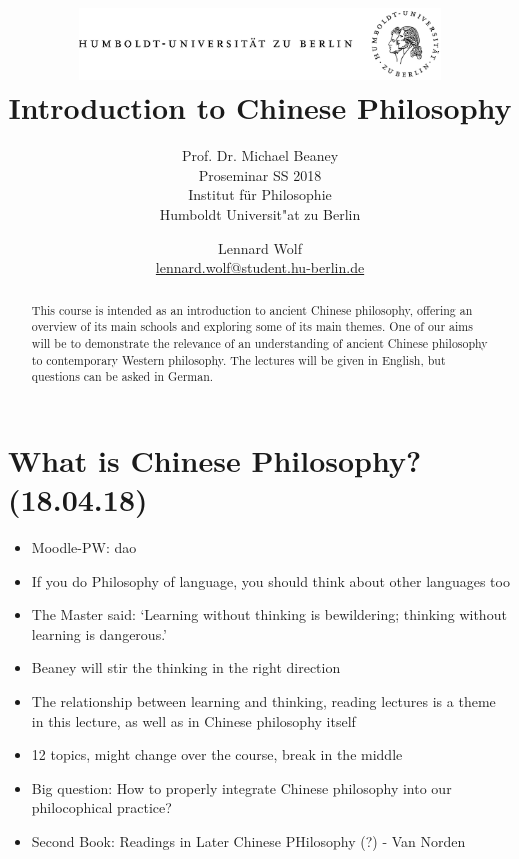 \documentclass[emulatestandardclasses]{scrartcl}
\date{\vspace{-3ex}}
\begin{document}
\title{
	\includegraphics*[bb=0 0 720 200, width=0.72\textwidth]{ErstesSem/images/hu_logo.png}\\
	\vspace{25pt}
	Introduction to Chinese Philosophy}
\subtitle{\vspace{10pt}
			Prof. Dr. Michael Beaney\\
			Proseminar SS 2018\\
          Institut für Philosophie\\ 
          Humboldt Universit"at zu Berlin}
\author{Lennard Wolf\\
        \small{\href{mailto:lennard.wolf@student.hu-berlin.de}{lennard.wolf@student.hu-berlin.de}}}
\maketitle
\begin{abstract}

This course is intended as an introduction to ancient Chinese philosophy, offering an overview of its main schools and exploring some of its main themes. One of our aims will be to demonstrate the relevance of an understanding of ancient Chinese philosophy to contemporary Western philosophy. The lectures will be given in English, but questions can be asked in German.

\end{abstract}
\newpage

\tableofcontents
\newpage


\section{What is Chinese Philosophy?\\(18.04.18)}

\begin{itemize}
  \item Moodle-PW: dao
  \item If you do Philosophy of language, you should think about other languages too
  \item The Master said: `Learning without thinking is bewildering; thinking without learning is dangerous.'
  \item Beaney will stir the thinking in the right direction
  \item The relationship between learning and thinking, reading lectures is a theme in this lecture, as well as in Chinese philosophy itself
  \item 12 topics, might change over the course, break in the middle
  \item Big question: How to properly integrate Chinese philosophy into our philocophical practice?
  \item Second Book: Readings in Later Chinese PHilosophy (?) - Van Norden
\end{itemize}
\end{document}
